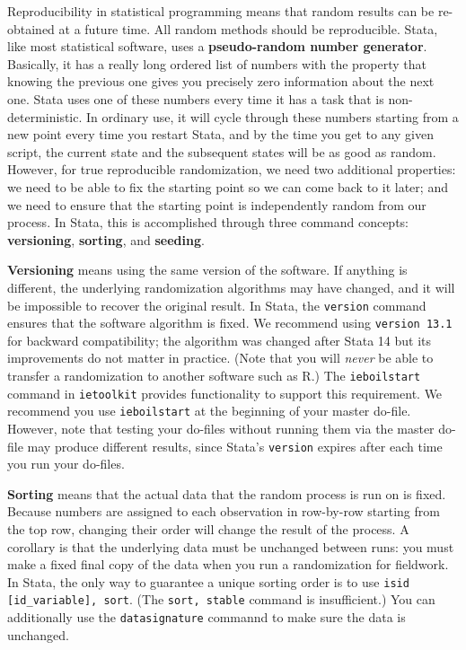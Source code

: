 Reproducibility in statistical programming means that random results
can be re-obtained at a future time.
All random methods should be reproducible.\cite{orozco2018make}
Stata, like most statistical software, uses a \textbf{pseudo-random number generator}.
Basically, it has a really long ordered list of numbers with the property that
knowing the previous one gives you precisely zero information about the next one.
Stata uses one of these numbers every time it has a task that is non-deterministic.
In ordinary use, it will cycle through these numbers starting from a new point
every time you restart Stata, and by the time you get to any given script,
the current state and the subsequent states will be as good as random.
However, for true reproducible randomization, we need two additional properties:
we need to be able to fix the starting point so we can come back to it later;
and we need to ensure that the starting point is independently random from our process.
In Stata, this is accomplished through three command concepts:
\textbf{versioning}, \textbf{sorting}, and \textbf{seeding}.

\textbf{Versioning} means using the same version of the software.
If anything is different, the underlying randomization algorithms may have changed,
and it will be impossible to recover the original result.
In Stata, the \texttt{version} command ensures that the software algorithm is fixed.
We recommend using \texttt{version 13.1} for backward compatibility;
the algorithm was changed after Stata 14 but its improvements do not matter in practice.
(Note that you will \textit{never} be able to transfer a randomization to another software such as R.)
The \texttt{ieboilstart} command in \texttt{ietoolkit} provides functionality to support this requirement.
We recommend you use \texttt{ieboilstart} at the beginning of your master do-file.
However, note that testing your do-files without running them
via the master do-file may produce different results,
since Stata's \texttt{version} expires after each time you run your do-files.

\textbf{Sorting} means that the actual data that the random process is run on is fixed.
Because numbers are assigned to each observation in row-by-row starting from 
the top row,
changing their order will change the result of the process.
A corollary is that the underlying data must be unchanged between runs:
you must make a fixed final copy of the data when you run a randomization for fieldwork.
In Stata, the only way to guarantee a unique sorting order is to use
\texttt{isid [id\_variable], sort}. (The \texttt{sort, stable} command is insufficient.)
You can additionally use the \texttt{datasignature} commannd to make sure the data is unchanged.


